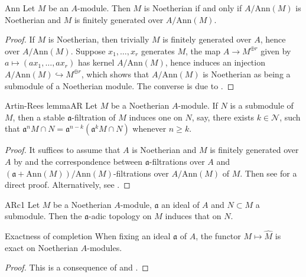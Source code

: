 \documentclass[10pt]{extarticle}
\begin{document}
\begin{lemma}{}{Ann}
    Let $M$ be an $A$-module. Then $M$ is Noetherian if and only if $A/\text{Ann}(M)$ is Noetherian and $M$ is finitely generated over $A/\text{Ann}(M)$.
\end{lemma}
\begin{proof}
    If $M$ is Noetherian, then trivially $M$ is finitely generated over $A$, hence over $A/\text{Ann}(M)$. Suppose $x_1,\dots,x_r$ generates $M$, the map $A\to M^{\oplus r}$ given by $a\mapsto (ax_1,\dots,ax_r)$ has kernel $A/\text{Ann}(M)$, hence induces an injection $A/\text{Ann}(M)\hookrightarrow M^{\oplus r}$, which shows that $A/\text{Ann}(M)$ is Noetherian as being a submodule of a Noetherian module. The converse is due to .
\end{proof}

\begin{theorem}{Artin-Rees lemma}{AR}
Let $M$ be a Noetherian $A$-module. If $N$ is a submodule of $M$, then a stable $\mathfrak{a}$-filtration of $M$ induces one on $N$, say, there exists $k\in\mathcal{N}$, such that $\mathfrak{a}^nM\cap N=\mathfrak{a}^{n-k}(\mathfrak{a}^kM\cap N)$ whenever $n\geq k$.
\end{theorem}

\begin{proof}
It suffices to assume that $A$ is Noetherian and $M$ is finitely generated over $A$ by  and the correspondence between $\mathfrak{a}$-filtrations over $A$ and $(\mathfrak{a}+\text{Ann}(M))/\text{Ann}(M)$-filtrations over $A/\text{Ann}(M)$ of $M$. Then see \cite[Theorem~8.5]{matsumura1989commutative} for a direct proof. Alternatively, see .
\end{proof}

\begin{corollary}{}{ARc1}
    Let $M$ be a Noetherian $A$-module, $\mathfrak{a}$ an ideal of $A$ and $N\subset M$ a submodule. Then the $\mathfrak{a}$-adic topology on $M$ induces that on $N$.
\end{corollary}

\begin{theorem}{Exactness of completion}{}
    When fixing an ideal $\mathfrak{a}$ of $A$, the functor $M\mapsto\widehat{M}$ is exact on Noetherian $A$-modules.
\end{theorem}

\begin{proof}
    This is a consequence of  and .
\end{proof}
\end{document}
